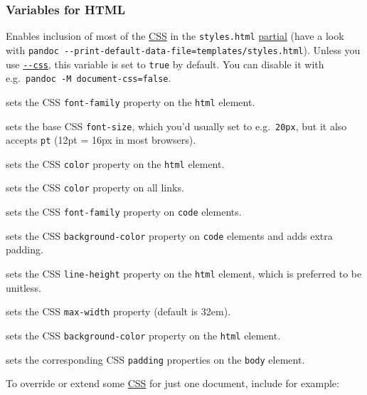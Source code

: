 \documentclass[
  a4paper,
]{article}
\providecommand{\tightlist}{%
  \setlength{\itemsep}{0pt}\setlength{\parskip}{0pt}}
\begin{document}
\hypertarget{variables-for-html}{%
\subsubsection{Variables for HTML}\label{variables-for-html}}

\begin{description}
\tightlist
\item[\texttt{document-css}]
Enables inclusion of most of the
\href{https://developer.mozilla.org/en-US/docs/Learn/CSS}{CSS} in the
\texttt{styles.html} \protect\hyperlink{partials}{partial} (have a look
with
\texttt{pandoc\ -\/-print-default-data-file=templates/styles.html}).
Unless you use \protect\hyperlink{option--css}{\texttt{-\/-css}}, this
variable is set to \texttt{true} by default. You can disable it with
e.g.~\texttt{pandoc\ -M\ document-css=false}.
\item[\texttt{mainfont}]
sets the CSS \texttt{font-family} property on the \texttt{html} element.
\item[\texttt{fontsize}]
sets the base CSS \texttt{font-size}, which you'd usually set to
e.g.~\texttt{20px}, but it also accepts \texttt{pt} (12pt = 16px in most
browsers).
\item[\texttt{fontcolor}]
sets the CSS \texttt{color} property on the \texttt{html} element.
\item[\texttt{linkcolor}]
sets the CSS \texttt{color} property on all links.
\item[\texttt{monofont}]
sets the CSS \texttt{font-family} property on \texttt{code} elements.
\item[\texttt{monobackgroundcolor}]
sets the CSS \texttt{background-color} property on \texttt{code}
elements and adds extra padding.
\item[\texttt{linestretch}]
sets the CSS \texttt{line-height} property on the \texttt{html} element,
which is preferred to be unitless.
\item[\texttt{maxwidth}]
sets the CSS \texttt{max-width} property (default is 32em).
\item[\texttt{backgroundcolor}]
sets the CSS \texttt{background-color} property on the \texttt{html}
element.
\item[\texttt{margin-left}, \texttt{margin-right}, \texttt{margin-top},
\texttt{margin-bottom}]
sets the corresponding CSS \texttt{padding} properties on the
\texttt{body} element.
\end{description}

To override or extend some
\href{https://developer.mozilla.org/en-US/docs/Learn/CSS}{CSS} for just
one document, include for example:
\end{document}

